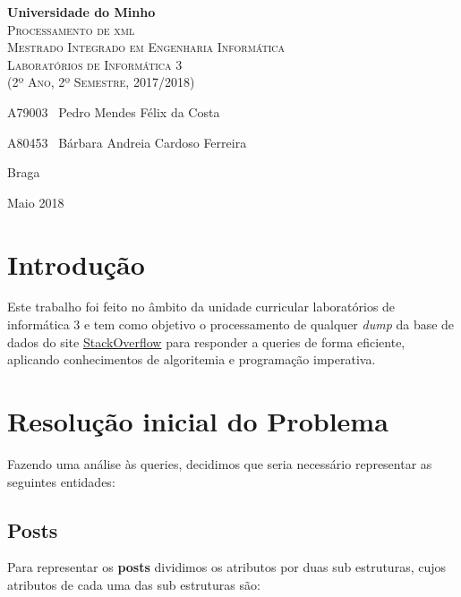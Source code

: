 \documentclass[10pt,a4paper]{article}
\begin{document}
\begin{titlepage}
    \center
    {\huge {\bf Universidade do Minho}}\\[0.4cm]
    \vspace{3.0cm}
    \textsc{\huge{Processamento de xml}}\\[0.5cm]
    \vspace{3.0cm}
    \textsc{\huge{Mestrado Integrado em Engenharia Informática}}\\[0.5cm]
    \vspace{2.0cm}
    \textsc{Laboratórios de Informática 3}\\[0.5cm]
    \textsc{(2º Ano, 2º Semestre, 2017/2018)}\\[0.5cm]
    \vspace{1.5cm}
    \begin{flushleft}
        A79003 \,\,\,Pedro Mendes Félix da Costa
        \vspace{0.2cm}

        A80453 \,\,\,Bárbara Andreia Cardoso Ferreira
    \end{flushleft}
        \vspace{1cm}
    \begin{flushright}
        Braga

        Maio 2018
    \end{flushright}

\end{titlepage}

\tableofcontents
\clearpage

\section{Introdução}
    Este trabalho foi feito no âmbito da unidade curricular laboratórios de
    informática 3 e tem como objetivo o processamento de qualquer \textit{dump}
    da base de dados do site \href{www.stackoverflow.com}{StackOverflow} para
    responder a queries de forma eficiente, aplicando conhecimentos de
    algoritemia e programação imperativa.

\section{Resolução inicial do Problema}
    Fazendo uma análise às queries, decidimos que seria necessário representar
    as seguintes entidades:

    \subsection{Posts}
    Para representar os \textbf{posts} dividimos os atributos por duas
     sub estruturas, cujos atributos de cada uma das sub estruturas são:
\end{document}
